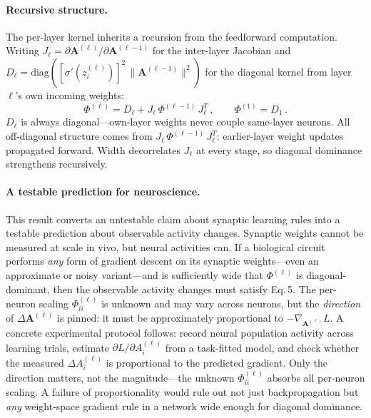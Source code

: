 \documentclass[10pt]{article}
\newcommand{\vA}{\mathbf{A}}
\begin{document}
\paragraph{Recursive structure.}
The per-layer kernel inherits a recursion from the feedforward computation.  Writing $J_\ell = \partial\vA^{(\ell)}/\partial\vA^{(\ell-1)}$ for the inter-layer Jacobian and $D_\ell = \mathrm{diag}([\sigma'(z_i^{(\ell)})]^2\,\lVert\vA^{(\ell-1)}\rVert^2)$ for the diagonal kernel from layer~$\ell$'s own incoming weights:
%
\begin{equation}\label{eq:phi-recursion}
  \Phi^{(\ell)} = D_\ell + J_\ell\,\Phi^{(\ell-1)}\,J_\ell^T\,,
  \qquad
  \Phi^{(1)} = D_1\,.
\end{equation}
%
$D_\ell$ is always diagonal---own-layer weights never couple same-layer neurons.  All off-diagonal structure comes from $J_\ell\,\Phi^{(\ell-1)}\,J_\ell^T$: earlier-layer weight updates propagated forward.  Width decorrelates $J_\ell$ at every stage, so diagonal dominance strengthens recursively.

\paragraph{A testable prediction for neuroscience.}
This result converts an untestable claim about synaptic learning rules into a testable prediction about observable activity changes.  Synaptic weights cannot be measured at scale in vivo, but neural activities can.  If a biological circuit performs \emph{any} form of gradient descent on its synaptic weights---even an approximate or noisy variant---and is sufficiently wide that $\Phi^{(\ell)}$ is diagonal-dominant, then the observable activity changes must satisfy Eq.\,5.  The per-neuron scaling $\Phi^{(\ell)}_{ii}$ is unknown and may vary across neurons, but the \emph{direction} of $\Delta\vA^{(\ell)}$ is pinned: it must be approximately proportional to $-\nabla_{\!\vA^{(\ell)}}L$.  A concrete experimental protocol follows: record neural population activity across learning trials, estimate $\partial L/\partial A_i^{(\ell)}$ from a task-fitted model, and check whether the measured $\Delta A_i^{(\ell)}$ is proportional to the predicted gradient.  Only the direction matters, not the magnitude---the unknown $\Phi^{(\ell)}_{ii}$ absorbs all per-neuron scaling.  A failure of proportionality would rule out not just backpropagation but \emph{any} weight-space gradient rule in a network wide enough for diagonal dominance.
\end{document}
